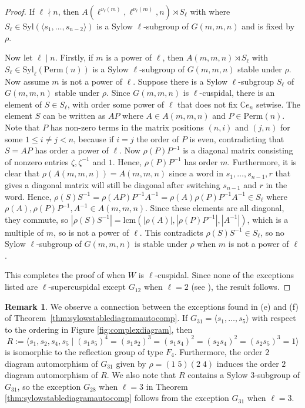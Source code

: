 \documentclass[12pt]{amsart}
\theoremstyle{plain}
\theoremstyle{definition}
\newtheorem{remark}[theorem]{Remark}
\numberwithin{equation}{section}
\numberwithin{equation}{section}
\begin{document}
\begin{proof}
		If $\ell\nmid n$, then $A(\ell^{\nu_\ell(m)},\ell^{\nu_\ell(m)},n)\rtimes S_\ell$ with where $S_\ell\in \text{Syl}(\langle s_1,\dots,s_{n-2}\rangle)$ is a Sylow $\ell$-subgroup of $G(m,m,n)$ and is fixed by $\rho$.
		
		Now let $\ell\mid n$. Firstly, if $m$ is a power of $\ell$, then $A(m,m,n)\rtimes S_\ell$ with $S_\ell\in \text{Syl}_\ell(\text{Perm}(n))$ is a Sylow $\ell$-subgroup of $G(m,m,n)$ stable under $\rho$. Now assume $m$ is not a power of $\ell$. Suppose there is a Sylow $\ell$-subgroup $S_\ell$ of $G(m,m,n)$ stable under $\rho$. Since $G(m,m,n)$ is $\ell$-cuspidal, there is an element of $S\in S_\ell$, with order some power of $\ell$ that does not fix $\mathbb{C}e_n$ setwise. The element $S$ can be written as $AP$ where $A\in A(m,m,n)$ and $P\in\text{Perm}(n)$. Note that $P$ has non-zero terms in the matrix positions $(n,i)$ and $(j,n)$ for some $1\leq i\neq j<n$, because if $i=j$ the order of $P$ is even, contradicting that $S=AP$ has order a power of $\ell$. Now $\rho(P)P^{-1}$ is a diagonal matrix consisting of nonzero entries $\zeta, \zeta^{-1}$ and $1$. Hence, $\rho(P)P^{-1}$ has order $m$. Furthermore, it is clear that $\rho(A(m,m,n))=A(m,m,n)$ since a word in $s_1,\dots,s_{n-1},r$ that gives a diagonal matrix will still be diagonal after switching $s_{n-1}$ and $r$ in the word. Hence, $\rho(S)S^{-1}=\rho(AP)P^{-1}A^{-1}=\rho(A)\rho(P)P^{-1}A^{-1}\in S_\ell$ where $\rho(A), \rho(P)P^{-1}, A^{-1}\in A(m,m,n)$. Since these elements are all diagonal, they commute, so $|\rho(S)S^{-1}|=\text{lcm}(|\rho(A)|, |\rho(P)P^{-1}|,|A^{-1}|)$, which is a multiple of $m$,  so is not a power of $\ell$. This contradicts $\rho(S)S^{-1}\in S_\ell$, so no Sylow $\ell$-subgroup of $G(m,m,n)$ is stable under $\rho$ when $m$ is not a power of $\ell$.
		
		This completes the proof of when $W$ is $\ell$-cuspidal. Since none of the exceptions listed are $\ell$-supercuspidal except $G_{12}$ when $\ell=2$ (see \cite[Table 3]{METOO}), the result follows.
	\end{proof}
	
	\begin{remark}
		We observe a connection between the exceptions found in (e) and (f) of Theorem~\ref{thm:sylowstablediagramautocomp}. If $G_{31}=\langle s_1,\dots, s_5 \rangle$ with respect to the ordering in Figure \ref{fig:complexdiagram}, then \[R:=\langle s_1,s_2,s_4,s_5\mid (s_1s_5)^4=(s_1s_2)^3=(s_1s_4)^2=(s_2s_4)^2=(s_2s_5)^3=1\rangle\] is isomorphic to the reflection group of type $F_4$. Furthermore, the order $2$ diagram automorphism of $G_{31}$ given by $\rho=(1\;5)(2\;4)$ induces the order $2$ diagram automorphism of $R$. We also note that $R$ contains a Sylow $3$-subgroup of $G_{31}$, so the exception $G_{28}$ when $\ell=3$ in Theorem \ref{thm:sylowstablediagramautocomp} follows from the exception $G_{31}$ when $\ell=3$.
	\end{remark}
	
\end{document}
